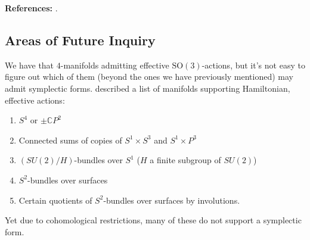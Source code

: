 \noindent \textbf{References: } \textcite{Delzant1988, MelvinParker1986}.

\subsection{Areas of Future Inquiry}

We have that $4$-manifolds admitting effective $\mathrm{SO}(3)$-actions, but it's not easy to figure out which of them (beyond the ones we have previously mentioned) may admit symplectic forms. \textcite{MelvinParker1986} described a list of manifolds supporting Hamiltonian, effective actions: 
\begin{enumerate}
    \item $S^4$ or $\pm \mathbb{C}P^2$
    \item Connected sums of copies of $S^1 \times S^3$ and $S^1 \times P^3$
    \item $(SU(2)/H)$-bundles over $S^1$ \quad ($H$ a finite subgroup of $SU(2)$)
    \item $S^2$-bundles over surfaces
    \item Certain quotients of $S^2$-bundles over surfaces by involutions.
\end{enumerate}
Yet due to cohomological restrictions, many of these do not support a symplectic form.

\newpage

\setcounter{section}{10}